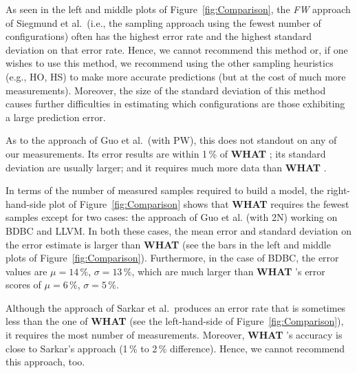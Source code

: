 \documentclass{newsig}
\newcommand{\what}{{\bf WHAT }}
\begin{document}
As seen in the left and middle plots of
Figure~\ref{fig:Comparison}, 
the {\em FW} approach of Siegmund et al.\ (i.e., the sampling approach using the fewest number of configurations) often has the highest
error rate and the highest
standard deviation on that error rate. Hence,
we cannot recommend this method or,  if one wishes to use this method, we recommend using the other sampling heuristics (e.g., HO, HS) to make more accurate predictions (but at the cost of much more measurements). Moreover, the size of the standard deviation of this method causes further difficulties in estimating which configurations are those exhibiting a large prediction error. 

As to the approach of Guo et al.\ (with PW), this   does not standout on any of
our measurements. Its error results are within 1\,\% of \what;
 its standard deviation are usually larger; and it requires
 much more data than \what.
 
 In terms of the number of measured samples required to build a model, 
 the right-hand-side plot of  Figure~\ref{fig:Comparison}  shows that
 \what requires the fewest samples except for two cases:
 the approach of Guo et al. (with 2N) working on BDBC and LLVM.  In both these cases, the mean error and standard deviation on the error
 estimate is   larger than \what  (see the  bars in the left and middle plots   of Figure~\ref{fig:Comparison}). Furthermore, in the case of BDBC, the error values
 are $\mu=14\,\%$, $\sigma=13\,\%$, which are much larger
than \what{}'s error scores of $\mu=6\,\%$, $\sigma=5\,\%$. 


Although the approach of Sarkar et al.\ produces an error rate that is sometimes less than the one of \what (see the left-hand-side of
Figure~\ref{fig:Comparison}), it requires the most number of measurements. Moreover, \what's accuracy is close to Sarkar's approach (1\,\%
to 2\,\% difference). Hence, we cannot recommend this approach, too.


 
\end{document}
